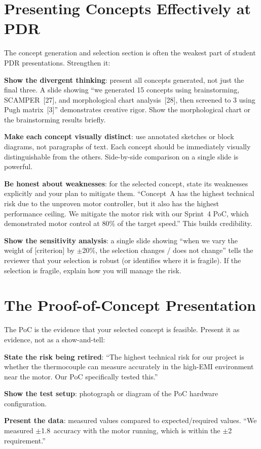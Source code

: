 \section{Presenting Concepts Effectively at PDR}
The concept generation and selection section is often the weakest part of student PDR presentations. Strengthen it:

\textbf{Show the divergent thinking}: present all concepts generated, not just the final three. A slide showing ``we generated 15 concepts using brainstorming, SCAMPER~[27], and morphological chart analysis~[28], then screened to 3 using Pugh matrix~[3]'' demonstrates creative rigor. Show the morphological chart or the brainstorming results briefly.

\textbf{Make each concept visually distinct}: use annotated sketches or block diagrams, not paragraphs of text. Each concept should be immediately visually distinguishable from the others. Side-by-side comparison on a single slide is powerful.

\textbf{Be honest about weaknesses}: for the selected concept, state its weaknesses explicitly and your plan to mitigate them. ``Concept~A has the highest technical risk due to the unproven motor controller, but it also has the highest performance ceiling. We mitigate the motor risk with our Sprint~4 PoC, which demonstrated motor control at 80\% of the target speed.'' This builds credibility.

\textbf{Show the sensitivity analysis}: a single slide showing ``when we vary the weight of [criterion] by $\pm$20\%, the selection changes / does not change'' tells the reviewer that your selection is robust (or identifies where it is fragile). If the selection is fragile, explain how you will manage the risk.

\section{The Proof-of-Concept Presentation}
The PoC is the evidence that your selected concept is feasible. Present it as evidence, not as a show-and-tell:

\textbf{State the risk being retired}: ``The highest technical risk for our project is whether the thermocouple can measure accurately in the high-EMI environment near the motor. Our PoC specifically tested this.''

\textbf{Show the test setup}: photograph or diagram of the PoC hardware configuration.

\textbf{Present the data}: measured values compared to expected/required values. ``We measured $\pm$1.8\,\degC{} accuracy with the motor running, which is within the $\pm$2\,\degC{} requirement.''

